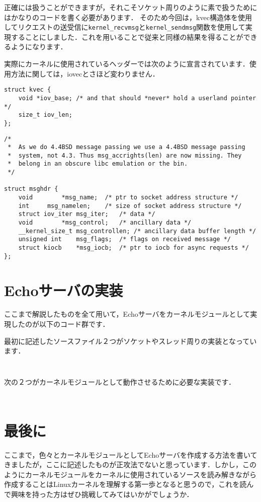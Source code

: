 正確には扱うことができますが，それこそソケット周りのように素で扱うためにはかなりのコードを書く必要があります．
そのため今回は，kvec構造体を使用してリクエストの送受信に\verb|kernel_recvmsg|と\verb|kernel_sendmsg|関数を使用して実現することにしました．これを用いることで従来と同様の結果を得ることができるようになります．

実際にカーネルに使用されているヘッダーでは次のように宣言されています．使用方法に関しては，iovecとさほど変わりません．
\begin{verbatim}
struct kvec {
    void *iov_base; /* and that should *never* hold a userland pointer */
    size_t iov_len;
};
\end{verbatim}
\begin{verbatim}
/*
 *  As we do 4.4BSD message passing we use a 4.4BSD message passing
 *  system, not 4.3. Thus msg_accrights(len) are now missing. They
 *  belong in an obscure libc emulation or the bin.
 */
 
struct msghdr {
    void        *msg_name;  /* ptr to socket address structure */
    int     msg_namelen;    /* size of socket address structure */
    struct iov_iter msg_iter;   /* data */
    void        *msg_control;   /* ancillary data */
    __kernel_size_t msg_controllen; /* ancillary data buffer length */
    unsigned int    msg_flags;  /* flags on received message */
    struct kiocb    *msg_iocb;  /* ptr to iocb for async requests */
};
\end{verbatim}

\section{Echoサーバの実装}
ここまで解説したものを全て用いて，Echoサーバをカーネルモジュールとして実現したのが以下のコード群です．

最初に記述したソースファイル２つがソケットやスレッド周りの実装となっています．
\inputminted[frame=lines,framesep=2mm,baselinestretch=1.2,fontsize=\footnotesize,linenos,breaklines]{c}{\lrfasset/echo_server.c}
\inputminted[frame=lines,framesep=2mm,baselinestretch=1.2,fontsize=\footnotesize,linenos,breaklines]{c}{\lrfasset/echo_server.h}
次の２つがカーネルモジュールとして動作させるために必要な実装です．
\inputminted[frame=lines,framesep=2mm,baselinestretch=1.2,fontsize=\footnotesize,linenos,breaklines]{c}{\lrfasset/fastecho.h}
\inputminted[frame=lines,framesep=2mm,baselinestretch=1.2,fontsize=\footnotesize,linenos,breaklines]{c}{\lrfasset/fastecho_module.c}

\section{最後に}
ここまで，色々とカーネルモジュールとしてEchoサーバを作成する方法を書いてきましたが，ここに記述したものが正攻法でないと思っています．しかし，このようにカーネルモジュールをカーネルに使用されているソースを読み解きながら作成することはLinuxカーネルを理解する第一歩となると思うので，これを読んで興味を持った方はぜひ挑戦してみてはいかがでしょうか．


